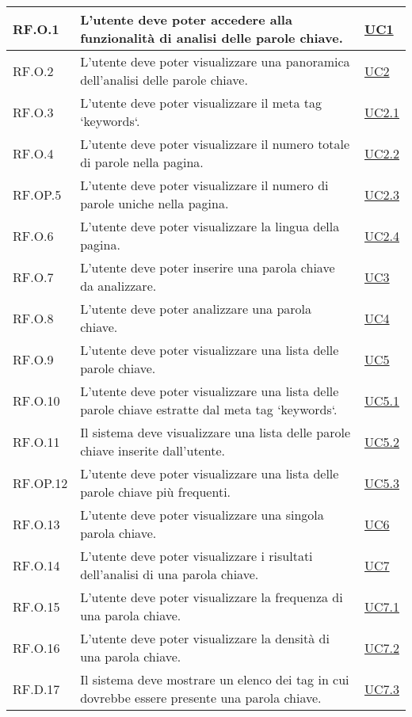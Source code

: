\begin{longtable}{p{}p{}p{}}
\hline
RF.O.1 & L'utente deve poter accedere alla funzionalità di analisi delle parole chiave. & \hyperref[UC1]{UC1} \\
\hline
RF.O.2 & L'utente deve poter visualizzare una panoramica dell'analisi delle parole chiave. & \hyperref[UC2]{UC2} \\
\hline
RF.O.3 & L'utente deve poter visualizzare il meta tag `keywords`. & \hyperref[UC2point1]{UC2.1} \\
\hline
RF.O.4 & L'utente deve poter visualizzare il numero totale di parole nella pagina. & \hyperref[UC2point2]{UC2.2} \\
\hline
RF.OP.5 & L'utente deve poter visualizzare il numero di parole uniche nella pagina. & \hyperref[UC2point3]{UC2.3} \\
\hline
RF.O.6 & L'utente deve poter visualizzare la lingua della pagina. & \hyperref[UC2point4]{UC2.4} \\
\hline
RF.O.7 & L'utente deve poter inserire una parola chiave da analizzare. & \hyperref[UC3]{UC3} \\
\hline
RF.O.8 & L'utente deve poter analizzare una parola chiave. & \hyperref[UC4]{UC4} \\
\hline
RF.O.9 & L'utente deve poter visualizzare una lista delle parole chiave. & \hyperref[UC5]{UC5} \\
\hline
RF.O.10 & L'utente deve poter visualizzare una lista delle parole chiave estratte dal meta tag `keywords`. & \hyperref[UC5point1]{UC5.1} \\
\hline
RF.O.11 & Il sistema deve visualizzare una lista delle parole chiave inserite dall'utente. & \hyperref[UC5point2]{UC5.2} \\
\hline
RF.OP.12 & L'utente deve poter visualizzare una lista delle parole chiave più frequenti. & \hyperref[UC5point3]{UC5.3} \\
\hline
RF.O.13 & L'utente deve poter visualizzare una singola parola chiave. & \hyperref[UC6]{UC6} \\
\hline
RF.O.14 & L'utente deve poter visualizzare i risultati dell'analisi di una parola chiave. & \hyperref[UC7]{UC7} \\
\hline
RF.O.15 & L'utente deve poter visualizzare la frequenza di una parola chiave. & \hyperref[UC7point1]{UC7.1} \\
\hline
RF.O.16 & L'utente deve poter visualizzare la densità di una parola chiave. & \hyperref[UC7point2]{UC7.2} \\
\hline
RF.D.17 & Il sistema deve mostrare un elenco dei tag in cui dovrebbe essere presente una parola chiave. & \hyperref[UC7point3]{UC7.3} \\

\end{longtable}
